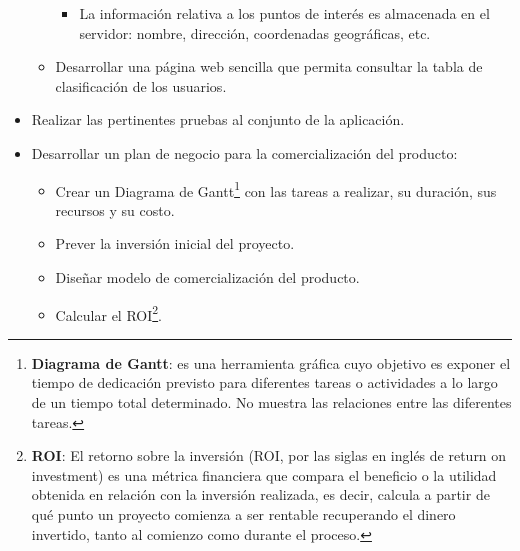 \begin{itemize}
\begin{itemize}
\begin{itemize}
        \item La información relativa a los puntos de interés es almacenada en el servidor: nombre, dirección, coordenadas geográficas, etc.
        
        \end{itemize}
    
    \item Desarrollar una página web sencilla que permita consultar la tabla de clasificación de los usuarios.
    
    \end{itemize}
\item Realizar las pertinentes pruebas al conjunto de la aplicación.

\item Desarrollar un plan de negocio para la comercialización del producto:

    \begin{itemize}
    
    \item Crear un Diagrama de Gantt\footnote{\textbf{Diagrama de Gantt}: es una herramienta gráfica cuyo objetivo es exponer el tiempo de dedicación previsto para diferentes tareas o actividades a lo largo de un tiempo total determinado. No muestra las relaciones entre las diferentes tareas.} con las tareas a realizar, su duración, sus recursos y su costo.
    
    \item Prever la inversión inicial del proyecto.
    
    \item Diseñar modelo de comercialización del producto.
    
    \item Calcular el ROI\footnote{\textbf{ROI}: El retorno sobre la inversión (ROI, por las siglas en inglés de return on investment) es una métrica financiera que compara el beneficio o la utilidad obtenida en relación con la inversión realizada, es decir, calcula a partir de qué punto un proyecto comienza a ser rentable recuperando el dinero invertido, tanto al comienzo como durante el proceso.}.
    
    \end{itemize}
    
\end{itemize}



